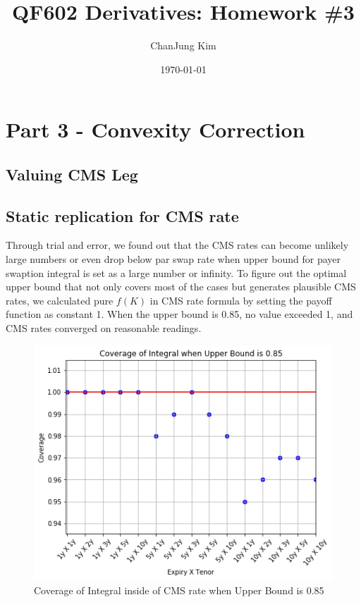 \documentclass{article}
\title{QF602 Derivatives: Homework \#3} %
\author{ChanJung Kim}
\date{\today} %
\begin{document}
	
	\maketitle %
	
	\section*{Part 3 - Convexity Correction} %
	
	\subsection*{Valuing CMS Leg}	


	
	\subsection*{Static replication for CMS rate}
	Through trial and error, we found out that the CMS rates can become unlikely large numbers or even drop below par swap rate when upper bound for payer swaption integral is set as a large number or infinity. To figure out the optimal upper bound that not only covers most of the cases but generates plausible CMS rates, we calculated pure $f(K)$ in CMS rate formula by setting the payoff function as constant 1. When the upper bound is 0.85, no value exceeded 1, and CMS rates converged on reasonable readings.

	\begin{figure}[h]
		\centering
		\includegraphics[scale=0.5]{Coverage.png}
		\caption{Coverage of Integral inside of CMS rate when Upper Bound is 0.85}
	\end{figure}
	
\end{document}
